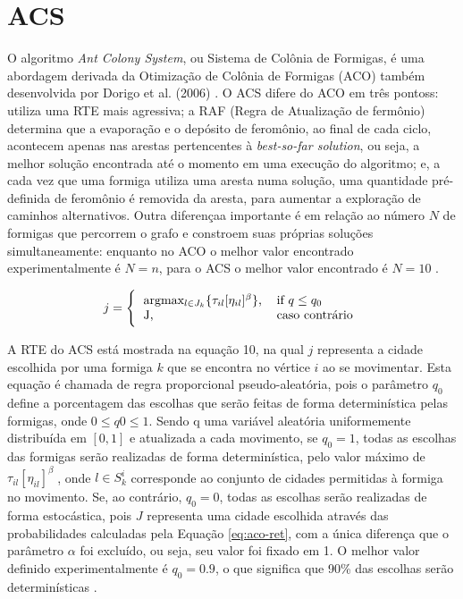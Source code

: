 \section{ACS}
\label{sec-acs}

O algoritmo \textit{Ant Colony System}, ou Sistema de Colônia de Formigas, é  uma abordagem derivada da Otimização de Colônia de Formigas (ACO) também desenvolvida por Dorigo et al. (2006) \cite{dorigo2008particle}. O ACS difere do ACO em três pontoss: utiliza uma RTE mais agressiva; a RAF (Regra de Atualização de fermônio) determina que a evaporação e o depósito de feromônio, ao final de cada ciclo, acontecem apenas nas arestas pertencentes à \textit{best-so-far solution}, ou seja, a melhor solução encontrada até o momento em uma execução do algoritmo; e, a cada vez que uma formiga utiliza uma aresta numa solução, uma quantidade pré-definida de feromônio é removida da aresta, para aumentar a exploração de caminhos alternativos. Outra diferençaa importante é em relação ao número $N$ de formigas que percorrem o grafo e constroem suas próprias soluções simultaneamente: enquanto no ACO o melhor valor encontrado experimentalmente é $N = n$, para o ACS o melhor valor encontrado é $N = 10$ \cite{dorigo2008particle}.

\begin{equation} \label{eq:acs-ret} 
    j = \Bigg\{
        \begin{tabular}{ll}
        argmax\(_{l \in J_k} \{\tau_{il}[\eta_{il}]^\beta\}\), & if $q \leq q_0$ \\
        J, & caso contrário
        \end{tabular}
\end{equation}

A RTE do ACS está mostrada na equação 10, na qual $j$ representa a cidade escolhida por uma formiga $k$ que se encontra
no vértice $i$ ao se movimentar. Esta equação é chamada de regra proporcional pseudo-aleatória, pois o parâmetro $q_0$ define a porcentagem das escolhas que serão feitas de forma determinística pelas formigas, onde $0 \leq q0 \leq 1$. Sendo q uma variável aleatória uniformemente distribuída em $[0, 1]$ e atualizada a cada movimento, se $q_0 = 1$, todas as escolhas das formigas serão realizadas de forma determinística, pelo valor máximo de $\tau_{il}[\eta_{il}]^\beta$, onde $l \in S_k^i$ corresponde ao conjunto de cidades permitidas à formiga no movimento. Se, ao contrário, $q_0 = 0$, todas as escolhas serão realizadas de forma estocástica, pois $J$ representa uma cidade escolhida através das probabilidades calculadas pela Equação \ref{eq:aco-ret}, com a única diferença que o parâmetro $\alpha$ foi excluído, ou seja, seu valor foi fixado em 1. O melhor valor definido experimentalmente é $q_0 = 0.9$, o que significa que 90\% das escolhas serão determinísticas \cite{dorigo2008particle}.

